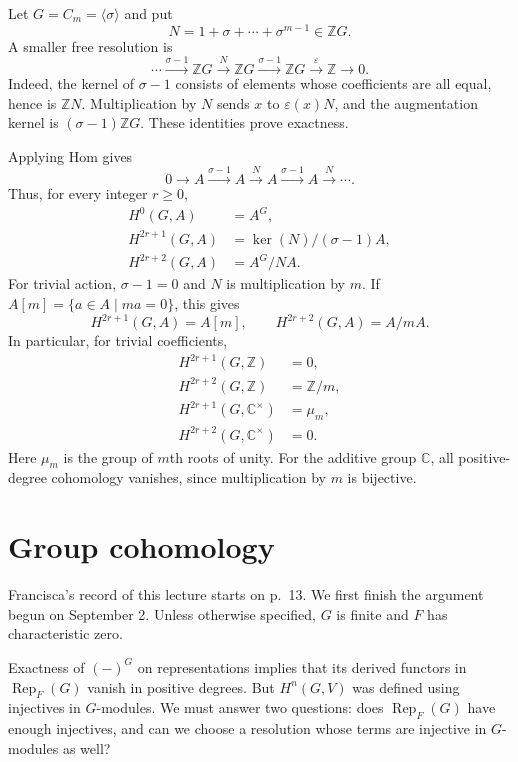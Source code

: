 \begin{example}
\label{example-ai-cyclic-sept-four}
Let $G=C_m=\langle\sigma\rangle$ and put
$$
N=1+\sigma+\cdots+\sigma^{m-1}
\in\mathbb{Z}G.
$$
A smaller free resolution is
$$
\cdots\xrightarrow{\sigma-1}\mathbb{Z}G
\xrightarrow{N}\mathbb{Z}G
\xrightarrow{\sigma-1}\mathbb{Z}G
\xrightarrow{\varepsilon}\mathbb{Z}\to0.
$$
Indeed, the kernel of $\sigma-1$ consists
of elements whose coefficients are all
equal, hence is $\mathbb{Z}N$.
Multiplication by $N$ sends $x$ to
$\varepsilon(x)N$, and the augmentation
kernel is $(\sigma-1)\mathbb{Z}G$.
These identities prove exactness.

Applying Hom gives
$$
0\to A\xrightarrow{\sigma-1}A
\xrightarrow{N}A
\xrightarrow{\sigma-1}A
\xrightarrow{N}\cdots.
$$
Thus, for every integer $r\geq0$,
$$
\begin{aligned}
H^0(G,A)&=A^G,\\
H^{2r+1}(G,A)&=\ker(N)/(\sigma-1)A,\\
H^{2r+2}(G,A)&=A^G/NA.
\end{aligned}
$$
For trivial action, $\sigma-1=0$ and
$N$ is multiplication by $m$. If
$A[m]=\{a\in A\mid ma=0\}$, this gives
$$
H^{2r+1}(G,A)=A[m],
\qquad H^{2r+2}(G,A)=A/mA.
$$
In particular, for trivial coefficients,
$$
\begin{aligned}
H^{2r+1}(G,\mathbb{Z})&=0,\\
H^{2r+2}(G,\mathbb{Z})&=\mathbb{Z}/m,\\
H^{2r+1}(G,\mathbb{C}^{\times})&=\mu_m,\\
H^{2r+2}(G,\mathbb{C}^{\times})&=0.
\end{aligned}
$$
Here $\mu_m$ is the group of $m$th roots
of unity. For the additive group
$\mathbb{C}$, all positive-degree
cohomology vanishes, since multiplication
by $m$ is bijective.
\end{example}

\section{Group cohomology}
\label{section-group-cohomology-4-sept}

\noindent
Francisca's record of this lecture starts
on p.~13. We first finish the argument
begun on September 2. Unless otherwise
specified, $G$ is finite and $F$ has
characteristic zero.

\medskip\noindent
Exactness of $(-)^G$ on representations
implies that its derived functors in
$\operatorname{Rep}_F(G)$ vanish in
positive degrees. But $H^n(G,V)$ was
defined using injectives in $G$-modules.
We must answer two questions: does
$\operatorname{Rep}_F(G)$ have enough
injectives, and can we choose a resolution
whose terms are injective in $G$-modules
as well?

